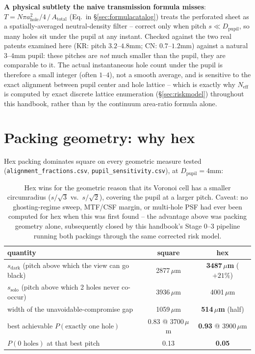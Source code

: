 \documentclass[11pt]{report}
\newcommand{\ahole}{a_{\text{hole}}}
\newcommand{\Neff}{N_{\text{eff}}}
\newcommand{\Dpupil}{D_{\text{pupil}}}
\begin{document}
\textbf{A physical subtlety the naive transmission formula misses}: $T=N\pi\ahole^2/4\,/\,
A_{\text{total}}$ (Eq.~in \S\ref{sec:formulacatalog}) treats the perforated sheet as a
spatially-averaged neutral-density filter -- correct only when pitch $s\ll\Dpupil$, so many
holes sit under the pupil at any instant. Checked against the two real patents examined here
(KR: pitch $3.2$--$4.8$mm; CN: $0.7$--$1.2$mm) against a natural $3$--$4$mm pupil: these
pitches are \emph{not} much smaller than the pupil, they are comparable to it. The actual
instantaneous hole count under the pupil is therefore a small integer (often $1$--$4$), not a
smooth average, and is sensitive to the exact alignment between pupil center and hole lattice
-- which is exactly why $\Neff$ is computed by exact discrete lattice enumeration
(\S\ref{sec:riskmodel}) throughout this handbook, rather than by the continuum area-ratio
formula alone.

\section{Packing geometry: why hex}
\label{sec:whyhex}
Hex packing dominates square on every geometric measure tested (\texttt{alignment\_fractions.csv},
\texttt{pupil\_sensitivity.csv}), at $\Dpupil{=}4$mm:
\begin{table}[h!]
\centering\small
\begin{tabular}{lcc}
\toprule
\textbf{quantity} & \textbf{square} & \textbf{hex} \\
\midrule
$s_{\text{dark}}$ (pitch above which the view can go black) & 2877\,$\mu$m & \textbf{3487\,$\mu$m} ($+21\%$) \\
$s_{\text{solo}}$ (pitch above which 2 holes never co-occur) & 3936\,$\mu$m & 4001\,$\mu$m \\
width of the unavoidable-compromise gap & 1059\,$\mu$m & \textbf{514\,$\mu$m} (half) \\
best achievable $P(\text{exactly one hole})$ & 0.83 @ 3700\,$\mu$m & \textbf{0.93} @ 3900\,$\mu$m \\
$P(0\text{ holes})$ at that best pitch & 0.13 & \textbf{0.05} \\
\bottomrule
\end{tabular}
\caption{Hex wins for the geometric reason that its Voronoi cell has a smaller
circumradius ($s/\sqrt3$ vs.\ $s/\sqrt2$), covering the pupil at a larger pitch. Caveat: no
ghosting-regime sweep, MTF/CSF margin, or multi-hole PSF had ever been computed for hex when
this was first found -- the advantage above was packing geometry alone, subsequently closed
by this handbook's Stage 0--3 pipeline running both packings through the same corrected risk
model.}
\end{table}
\end{document}
